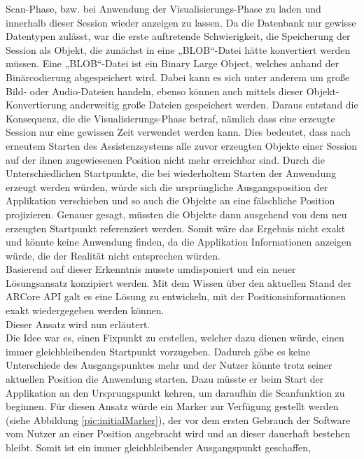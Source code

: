Scan-Phase, bzw. bei Anwendung der Visualisierungs-Phase zu laden und innerhalb dieser Session wieder anzeigen zu lassen. Da die Datenbank nur gewisse Datentypen 
zulässt, war die erste auftretende Schwierigkeit, die Speicherung der Session als Objekt, die zunächst in eine „BLOB“-Datei hätte konvertiert werden müssen. Eine 
„BLOB“-Datei ist ein Binary Large Object, welches anhand der Binärcodierung abgespeichert wird. Dabei kann es sich unter anderem um große 
Bild- oder Audio-Dateien handeln, ebenso können auch mittels dieser Objekt-Konvertierung anderweitig große Dateien gespeichert werden. Daraus entstand die 
Konsequenz, die die Visualisierungs-Phase betraf, nämlich dass eine erzeugte Session nur eine gewissen Zeit verwendet werden kann. Dies bedeutet, dass nach erneutem 
Starten des Assistenzsystems alle zuvor erzeugten Objekte einer Session auf der ihnen zugewiesenen Position nicht mehr erreichbar sind. Durch die Unterschiedlichen 
Startpunkte, die bei wiederholtem Starten der Anwendung erzeugt werden würden, würde sich die ursprüngliche Ausgangsposition der Applikation verschieben und so auch 
die Objekte an eine fälschliche Position projizieren. Genauer gesagt, müssten die Objekte dann ausgehend von dem neu erzeugten Startpunkt referenziert werden. Somit wäre das 
Ergebnis nicht exakt und könnte keine Anwendung finden, da die Applikation Informationen anzeigen würde, die der Realität nicht entsprechen würden. 
\\ 
Basierend auf dieser Erkenntnis musste umdisponiert und ein neuer Lösungsansatz konzipiert werden. Mit dem Wissen über den aktuellen Stand der ARCore \acs{API} 
galt es eine Lösung zu entwickeln, mit der Positionsinformationen exakt wiedergegeben werden können. 
\\ 
Dieser Ansatz wird nun erläutert.
\\ 
\linebreak
Die Idee war es, einen Fixpunkt zu erstellen, welcher dazu dienen würde, einen immer gleichbleibenden Startpunkt vorzugeben. Dadurch gäbe es keine Unterschiede des 
Ausgangspunktes mehr und der Nutzer könnte trotz seiner aktuellen Position die Anwendung starten. Dazu müsste er beim Start der Applikation an den Ursprungspunkt kehren, 
um daraufhin die Scanfunktion zu beginnen. Für diesen Ansatz würde ein Marker zur Verfügung gestellt werden (siehe Abbildung \ref{pic:initialMarker}), der vor dem ersten 
Gebrauch der Software vom Nutzer an einer Position angebracht wird und an dieser dauerhaft bestehen bleibt. Somit ist ein immer gleichbleibender Ausgangspunkt geschaffen, 
